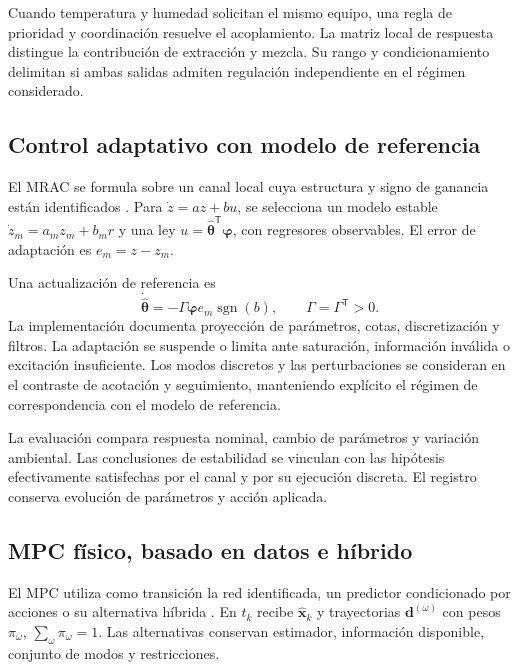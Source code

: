 Cuando temperatura y humedad solicitan el mismo equipo, una regla de prioridad y coordinación resuelve el acoplamiento. La matriz local de respuesta distingue la contribución de extracción y mezcla. Su rango y condicionamiento delimitan si ambas salidas admiten regulación independiente en el régimen considerado.

\subsection{Control adaptativo con modelo de referencia}
\label{met:mrac}

El MRAC se formula sobre un canal local cuya estructura y signo de ganancia están identificados \cite{astrom1995}. Para $\dot z=az+bu$, se selecciona un modelo estable $\dot z_m=a_mz_m+b_mr$ y una ley $u=\widehat{\boldsymbol\theta}^{\mathsf T}\boldsymbol\varphi$, con regresores observables. El error de adaptación es $e_m=z-z_m$.

Una actualización de referencia es
\begin{equation}
\dot{\widehat{\boldsymbol\theta}}=-\Gamma\boldsymbol\varphi e_m\operatorname{sgn}(b),
\qquad \Gamma=\Gamma^{\mathsf T}>0.
\label{met:mrac_actualizacion}
\end{equation}
La implementación documenta proyección de parámetros, cotas, discretización y filtros. La adaptación se suspende o limita ante saturación, información inválida o excitación insuficiente. Los modos discretos y las perturbaciones se consideran en el contraste de acotación y seguimiento, manteniendo explícito el régimen de correspondencia con el modelo de referencia.

La evaluación compara respuesta nominal, cambio de parámetros y variación ambiental. Las conclusiones de estabilidad se vinculan con las hipótesis efectivamente satisfechas por el canal y por su ejecución discreta. El registro conserva evolución de parámetros y acción aplicada.

\subsection{MPC físico, basado en datos e híbrido}
\label{met:mpc}

El MPC utiliza como transición la red identificada, un predictor condicionado por acciones o su alternativa híbrida \cite{rawlings2017}. En $t_k$ recibe $\widehat{\mathbf x}_k$ y trayectorias $\mathbf d^{(\omega)}$ con pesos $\pi_\omega$, $\sum_\omega\pi_\omega=1$. Las alternativas conservan estimador, información disponible, conjunto de modos y restricciones.

